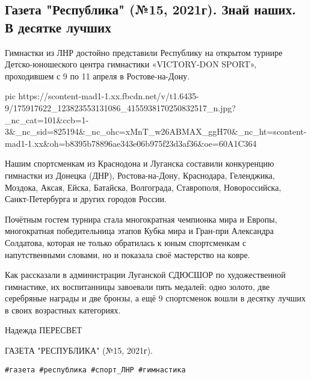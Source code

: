  
 
 
 
 

\subsection{Газета "Республика" (№15, 2021г).  Знай наших. В десятке лучших}

Гимнастки из ЛНР достойно представили Республику на открытом турнире
Детско-юношеского центра гимнастики «VICTORY-DON SPORT», проходившем с 9 по 11
апреля в Ростове-на-Дону.

\ifcmt
  pic https://scontent-mad1-1.xx.fbcdn.net/v/t1.6435-9/175917622_123823553131086_4155938170250832517_n.jpg?_nc_cat=101&ccb=1-3&_nc_sid=825194&_nc_ohc=xMnT_w26ABMAX_ggH70&_nc_ht=scontent-mad1-1.xx&oh=b8395b78896ae343e06b975f23d3af36&oe=60A1C364
\fi

Нашим спортсменкам из Краснодона и Луганска составили конкуренцию гимнастки из
Донецка (ДНР), Ростова-на-Дону, Краснодара, Геленджика, Моздока, Аксая, Ейска,
Батайска, Волгограда, Ставрополя, Новороссийска, Санкт-Петербурга и других
городов России.

Почётным гостем турнира стала многократная чемпионка мира и Европы,
многократная победительница этапов Кубка мира и Гран-при Александра Солдатова,
которая не только обратилась к юным спортсменкам с напутственными словами, но и
показала своё мастерство на ковре. 

Как рассказали в администрации Луганской СДЮСШОР по художественной гимнастике,
их воспитанницы завоевали пять медалей: одно золото, две серебряные награды и
две бронзы, а ещё 9 спортсменок вошли в десятку лучших в своих возрастных
категориях.

Надежда ПЕРЕСВЕТ

ГАЗЕТА "РЕСПУБЛИКА" (№15, 2021г).

\verb|#газета #республика #спорт_ЛНР #гимнастика|
